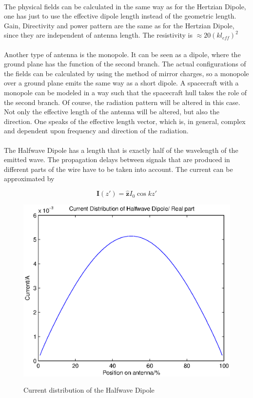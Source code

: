 \documentclass[a4paper,10pt]{thesis}
\begin{document}
\paragraph*{}
The physical fields can be calculated in the same way as for the Hertzian Dipole, one has just to use the effective dipole length instead of the geometric length. Gain, Directivity and power pattern are the same as for the Hertzian Dipole, since they are independent of antenna length. The resistivity is $\approx 20 (k l_{eff} )^2$
\paragraph*{}
Another type of antenna is the monopole. It can be seen as a dipole, where the ground plane has the function of the second branch. The actual configurations of the fields can be calculated by using the method of mirror charges, so a monopole over a ground plane emits the same way as a short dipole. A spacecraft with a monopole can be modeled in a way such that the spacecraft hull takes the role of the second branch. Of course, the radiation pattern will be altered in this case. Not only the effective length of the antenna will be altered, but also the direction. One speaks of the effective length vector, which is, in general, complex and dependent upon frequency and direction of the radiation.

\paragraph*{}
The Halfwave Dipole has a length that is exactly half of the wavelength of the emitted wave. The propagation delays between signals that are produced in different parts of the wire have to be taken into account. The current can be approximated by

\begin{equation}\label{hwd_current}
 \mathbf{I}(z') = \mathbf{\hat{z}} I_0 \cos kz'
\end{equation}

\begin{figure}
  \includegraphics[width=12cm]{phase_distr_shd}\\
  \caption{Current distribution of the Halfwave Dipole}\label{fig_curr_distr_hwd}
\end{figure}
\end{document}
